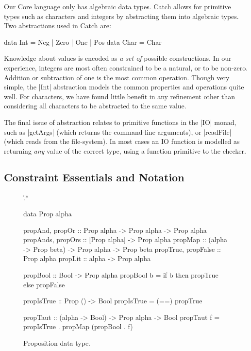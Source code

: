 Our Core language only has algebraic data types. Catch allows for primitive types such as characters and integers by abstracting them into algebraic types. Two abstractions used in Catch are:

\ignore\begin{code}
data Int = Neg | Zero | One | Pos
data Char = Char
\end{code}

Knowledge about values is encoded as \textit{a set of} possible constructions. In our experience, integers are most often constrained to be a natural, or to be non-zero. Addition or subtraction of one is the most common operation. Though very simple, the |Int| abstraction models the common properties and operations quite well. For characters, we have found little benefit in any refinement other than considering all characters to be abstracted to the same value.

The final issue of abstraction relates to primitive functions in the |IO| monad, such as |getArgs| (which returns the command-line arguments), or |readFile| (which reads from the file-system). In most cases an IO function is modelled as returning \textit{any} value of the correct type, using a function primitive to the checker.

\subsection{Constraint Essentials and Notation}
\label{secC:constraints}

\begin{figure}
\h{.*}\begin{code}
data Prop alpha

propAnd, propOr           :: Prop alpha -> Prop alpha -> Prop alpha
propAnds, propOrs         :: [Prop alpha] -> Prop alpha
propMap                   :: (alpha -> Prop beta) -> Prop alpha -> Prop beta
propTrue, propFalse       :: Prop alpha
propLit                   :: alpha -> Prop alpha

propBool :: Bool -> Prop alpha
propBool b = if b then propTrue else propFalse

propIsTrue :: Prop () -> Bool
propIsTrue = (==) propTrue

propTaut :: (alpha -> Bool) -> Prop alpha -> Bool
propTaut f = propIsTrue . propMap (propBool . f)
\end{code}
\caption{Proposition data type.}
\label{figC:prop}
\end{figure}

